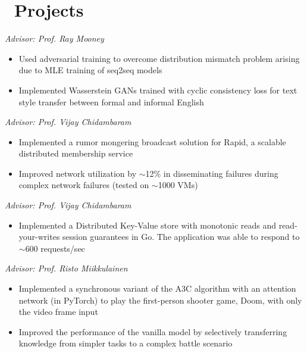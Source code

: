 \documentclass{resume}
\begin{document}

\section{\faCodeFork\ Projects}
\textit{Advisor: Prof. Ray Mooney} \hfill
\begin{itemize}
	\item Used adversarial training to overcome distribution mismatch problem arising due to MLE training of seq2seq models
	\item Implemented Wasserstein GANs trained with cyclic consistency loss for text style transfer between formal and informal English
\end{itemize}

\textit{Advisor: Prof. Vijay Chidambaram} \hfill
\begin{itemize}
	\item Implemented a rumor mongering broadcast solution for Rapid, a scalable distributed membership service
	\item Improved network utilization by $\sim$12\% in disseminating failures during complex network failures (tested on $\sim$1000 VMs)
\end{itemize}

\textit{Advisor: Prof. Vijay Chidambaram} \hfill
\begin{itemize}
	\item Implemented a Distributed Key-Value store with monotonic reads and read-your-writes session guarantees in Go. The application was able to respond to $\sim$600 requests/sec
\end{itemize}

\textit{Advisor: Prof. Risto Miikkulainen} \hfill
\begin{itemize}
	\item Implemented a synchronous variant of the A3C algorithm with an attention network (in PyTorch) to play the first-person shooter game, Doom, with only the video frame input
	\item Improved the performance of the vanilla model by selectively transferring knowledge from simpler tasks to a complex battle scenario
\end{itemize}
\end{document}
